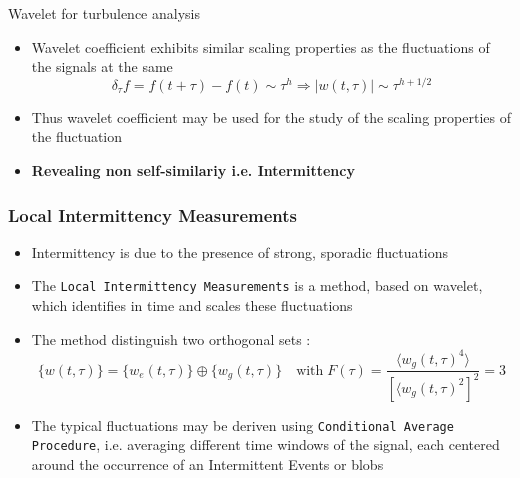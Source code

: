 \documentclass[t,10pt]{beamer}
\begin{document}
\begin{frame}{Wavelet for turbulence analysis}
 \begin{itemize}[<+->]
  \item Wavelet coefficient exhibits similar
    scaling properties as the fluctuations of the signals at the same
\begin{equation*}
\delta_{\tau} f = f(t+\tau)-f(t) \sim \tau^h \Rightarrow |w(t,\tau)|\sim\tau^{h+1/2}
\end{equation*}
\item Thus wavelet coefficient may be used for the study of the
  scaling properties of the fluctuation

\item \textcolor{tascarletred}{\textbf{Revealing non
      self-similariy i.e. Intermittency}}


\end{itemize}
\end{frame}

\begin{frame}
  \frametitle{Local Intermittency Measurements}
  \begin{itemize}
\item Intermittency is due to the presence of strong, sporadic fluctuations
\item The \textcolor{ta3chameleon}{\texttt{Local Intermittency
      Measurements}} is a method, based on wavelet, which identifies in time and
  scales these fluctuations {\footnotesize\parencite{Antoni:2001tm}}
  \item The method distinguish two orthogonal sets :
\begin{equation*}
\{w(t,\tau)\} = \{w_e(t,\tau)\}\oplus \{w_g(t,\tau)\} \quad
\text{with} \;
F(\tau)=\frac{\langle w_g(t,\tau)^4\rangle}{[\langle w_g(t,\tau)^2]^2}
= 3
\end{equation*}
\item The typical fluctuations may be deriven using
  \textcolor{ta3chameleon}{\texttt{Conditional Average Procedure}},
  i.e. averaging different time windows of the signal, each 
  centered around the occurrence of an
  \alert{Intermittent Events} or \alert{blobs}

  \end{itemize}
\end{frame}
\end{document}
